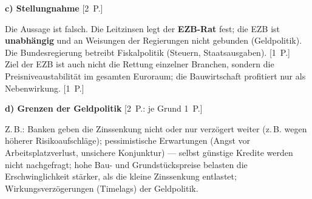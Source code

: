 \begin{loesung}[title={Lösung Aufgabe~3.5 --- Leitzinssenkung der EZB}]
\medskip
\textbf{c) Stellungnahme} \hfill [2~P.]

Die Aussage ist falsch. Die Leitzinsen legt der \textbf{EZB-Rat} fest; die EZB ist
\textbf{unabhängig} und an Weisungen der Regierungen nicht gebunden (Geldpolitik). Die
Bundesregierung betreibt Fiskalpolitik (Steuern, Staatsausgaben). [1~P.]\\
Ziel der EZB ist auch nicht die Rettung einzelner Branchen, sondern die
Preisniveaustabilität im gesamten Euroraum; die Bauwirtschaft profitiert nur als
Nebenwirkung. [1~P.]

\medskip
\textbf{d) Grenzen der Geldpolitik} \hfill [2~P.: je Grund 1~P.]

Z.\,B.: Banken geben die Zinssenkung nicht oder nur verzögert weiter (z.\,B. wegen
höherer Risikoaufschläge); pessimistische Erwartungen (Angst vor Arbeitsplatzverlust,
unsichere Konjunktur) --- selbst günstige Kredite werden nicht nachgefragt; hohe Bau- und
Grundstückspreise belasten die Erschwinglichkeit stärker, als die kleine Zinssenkung
entlastet; Wirkungsverzögerungen (Timelags) der Geldpolitik.
\end{loesung}

